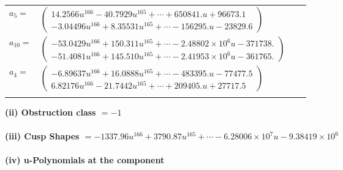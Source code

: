 \documentclass[1p]{elsarticle_modified}
\theoremstyle{definition}
\begin{document}
\begin{tabular}{m{7pt} m{180pt} m{7pt} m{180pt} }
\flushright $a_{5}=$&$\begin{pmatrix}14.2566 u^{166}-40.7929 u^{165}+\cdots+650841. u+96673.1\\-3.04496 u^{166}+8.35531 u^{165}+\cdots-156295. u-23829.6\end{pmatrix}$ \\
\flushright $a_{10}=$&$\begin{pmatrix}-53.0429 u^{166}+150.311 u^{165}+\cdots-2.48802\times10^{6} u-371738.\\-51.4081 u^{166}+145.510 u^{165}+\cdots-2.41953\times10^{6} u-361765.\end{pmatrix}$ \\
\flushright $a_{4}=$&$\begin{pmatrix}-6.89637 u^{166}+16.0888 u^{165}+\cdots-483395. u-77477.5\\6.82176 u^{166}-21.7442 u^{165}+\cdots+209405. u+27717.5\end{pmatrix}$\\&\end{tabular}
\flushleft \textbf{(ii) Obstruction class $= -1$}\\~\\
\flushleft \textbf{(iii) Cusp Shapes $= -1337.96 u^{166}+3790.87 u^{165}+\cdots-6.28006\times10^{7} u-9.38419\times10^{6}$}\\~\\
\newpage\renewcommand{\arraystretch}{1}
\flushleft \textbf{(iv) u-Polynomials at the component}\newline \\
\end{document}
